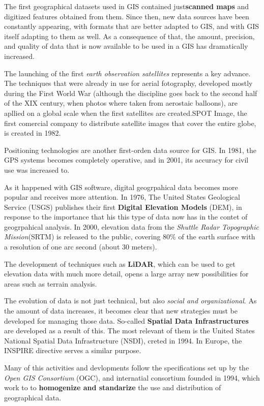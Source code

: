 The first geographical datasets used in GIS contained just\textbf{scanned maps} and {digitized features} obtained from them. Since then, new data sources have been constantly appearing, with formats that are better adapted to GIS, and with GIS itself adapting to them as well. As a consequence of that, the amount, precision, and quality of data that is now available to be used in a GIS has dramatically increased.

The launching of the first \emph{earth observation satellites} represents a key advance. The techniques that were already in use for aerial fotography, developed mostly during the First World War (although the discipline goes back to the second half of the XIX century, when photos where taken from aerostaic balloons), are apllied on a global scale when the first satellites are created.SPOT Image, the first comercial company to distribute satellite images that cover the entire globe, is created in 1982.

Positioning technologies are another first-orden data source for GIS. In 1981, the GPS systems becomes completely operative, and in 2001, its accuracy for civil use was increased to.

As it happened with GIS software, digital geogrpahical data becomes more popular and receives more attention. In 1976, The United States Geological Service (USGS) publishes their first \textbf{Digital Elevation Models} (DEM), in response to the importance that his this type of data now has in the contet of geogrpahical analysis. In 2000, elevation data from the \emph{Shuttle Radar Topographic Mission}(SRTM) is released to the public, covering 80\% of the earth surface with a resolution of one arc second (about 30 meters).

The development of techniques such as \textbf{LiDAR}, which can be used to get elevation data with much more detail,  opens a large array new possibilities for areas such as terrain analysis.

The evolution of data is not just technical, but also \emph{social and organizational}. As the amount of data increases, it becomes clear that new strategies must be developed for managing those data. So-called \textbf{Spatial Data Infrastructures} are developed as a result of this. The most relevant of them is the United States National Spatial Data Infrastructure (NSDI), creted in 1994. In Europe, the INSPIRE directive serves a similar purpose.

Many of this activities and devlopments follow the specifications set up by the \emph{Open GIS Consortium} (OGC), and internatial consortium founded in 1994, which work to to \textbf{homogenize and standarize} the use and distribution of geographical data.

